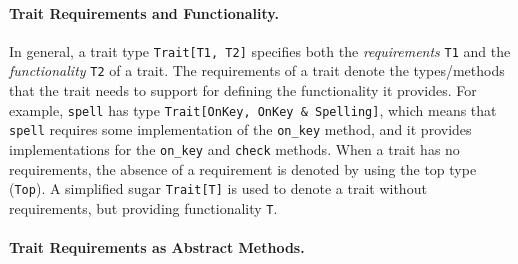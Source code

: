 \paragraph{Trait Requirements and Functionality.}
In general, a trait type
\lstinline{Trait[T1, T2]} specifies both the \emph{requirements} \lstinline{T1}
and the \emph{functionality} \lstinline{T2} of a trait. The requirements of a trait denote the types/methods that the
trait needs to support for defining the functionality it provides. %
For example, \lstinline{spell} has type
\lstinline{Trait[OnKey, OnKey & Spelling]}, which means that \lstinline{spell}
requires some implementation of the \lstinline{on_key} method, and it provides
implementations for the \lstinline{on_key} and \lstinline{check} methods.
When a trait
has no requirements, the absence of a requirement is denoted by using
the top type (\lstinline{Top}). A simplified sugar \lstinline{Trait[T]} is
used to denote a trait without requirements, but providing functionality \lstinline{T}.




\paragraph{Trait Requirements as Abstract Methods.}

